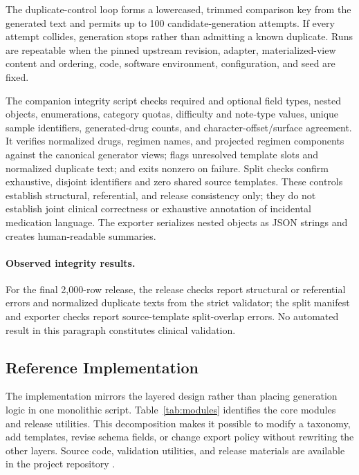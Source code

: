 \documentclass[conference]{IEEEtran}
\newif\ifanonymous
\begin{document}
The duplicate-control loop forms a lowercased, trimmed comparison key from the
generated text and permits up to 100 candidate-generation attempts. If every
attempt collides, generation stops rather than admitting a known duplicate.
Runs are repeatable when the pinned upstream revision, adapter, materialized-view
content and ordering, code, software environment, configuration, and seed are
fixed.

The companion integrity script checks required and optional field types,
nested objects, enumerations, category quotas, difficulty and note-type values,
unique sample identifiers, generated-drug counts, and character-offset/surface
agreement. It verifies normalized drugs, regimen names, and projected regimen
components against the canonical generator views; flags unresolved template
slots and normalized duplicate text; and exits nonzero on failure. Split checks
confirm exhaustive, disjoint identifiers and zero shared source templates.
These controls establish structural,
referential, and release consistency only; they do not establish joint clinical
correctness or exhaustive annotation of incidental medication language. The
exporter serializes nested objects as JSON strings and creates human-readable
summaries.

\paragraph{Observed integrity results.}
For the final 2,000-row release, the release checks report
\FinalValidationErrors{} structural or referential errors and
\FinalDuplicateTexts{} normalized duplicate texts from the strict validator;
the split manifest and exporter checks report
\FinalSplitLeakageErrors{} source-template split-overlap errors. No automated
result in this paragraph constitutes clinical validation.

\subsection{Reference Implementation}

The implementation mirrors the layered design rather than placing generation
logic in one monolithic script. Table~\ref{tab:modules} identifies the core
modules and release utilities. This decomposition makes it possible to
modify a taxonomy, add templates, revise schema fields, or change export policy
without rewriting the other layers. \ifanonymous
Source code, validation utilities, and release materials are described by an
artifact citation withheld from the paper body for review
\cite{shivanna2026github}.\else
Source code, validation utilities, and release materials are available in the
project repository \cite{shivanna2026github}.\fi
\end{document}
